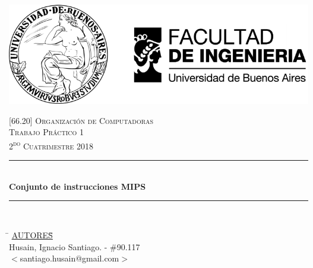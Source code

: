 

\pagestyle{fancy}
\begin{titlepage}
	\newcommand{\HRule}{\rule{\linewidth}{0.5mm}} %
	\center %
	
	\thispagestyle{empty}
	\begin{center}
		\includegraphics[scale=1]{includes/banner_fiuba.pdf}\\
	\end{center}
	
	
	\textsc{\LARGE \textsc{[66.20] Organización de Computadoras}}\\[0.5cm]
	\textsc{\Large \textsc{Trabajo Práctico 1}}\\[0.5cm]
	\textsc{\large 2\textsuperscript{do} Cuatrimestre 2018}\\[0.25cm]
	
	\HRule\\[0.5cm]
	{\huge\bfseries Conjunto de instrucciones MIPS}\\[0.2cm]
	\HRule\\[0.5cm]
	
	\begin{tabbing}
		\hspace{2cm}\=\+
		\underline{AUTORES}\hspace{-1cm}\=\+\hspace{1cm}\=\hspace{6cm}\=\\[0.2cm]
		
		Husain, Ignacio Santiago.	\>\>- \#90.117\\
		\>\footnotesize{$<$santiago.husain@gmail.com$>$}\\
		

\end{tabbing}
\end{titlepage}
